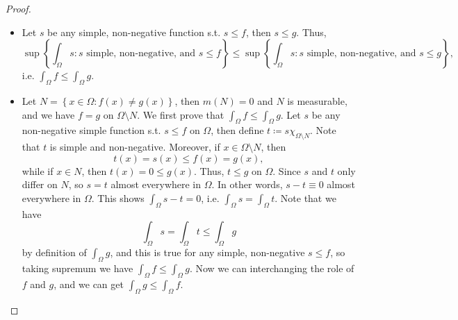 \begin{proof}
\begin{itemize}
    \item [(c)] Let \(s\) be any simple, non-negative function s.t. \(s \le f\), then \(s \le g\). Thus,
    \[
        \sup \left\{ \int _\Omega s: s \text{ simple, non-negative, and } s \le f  \right\} \le \sup \left\{ \int _\Omega s: s \text{ simple, non-negative, and } s \le g  \right\},
    \]
    i.e. \(\int _\Omega f \le \int _\Omega g\). 

    \item [(d)] Let \(N = \left\{ x \in \Omega : f(x) \neq g(x) \right\} \), then \(m(N) = 0\) and \(N\) is measurable, and we have \(f = g\) on \(\Omega \setminus N\). We first prove that \(\int _\Omega f \le \int _\Omega g\). Let \(s\) be any non-negative simple function s.t. \(s \le f\) on \(\Omega \), then define \(t\coloneqq s \chi _{\Omega \setminus N}\). Note that \(t\) is simple and non-negative. Moreover, if \(x \in \Omega \setminus N\), then 
    \[
        t(x) = s(x) \le f(x) = g(x),
    \]
    while if \(x \in N\), then \(t(x) = 0 \le g(x)\). Thus, \(t \le g\) on \(\Omega\). Since \(s\) and \(t\) only differ on \(N\), so \(s = t\) almost everywhere in \(\Omega \). In other words, \(s - t \equiv 0\) almost everywhere in \(\Omega \). This shows \(\int _\Omega s - t = 0\), i.e. \(\int _\Omega s = \int _\Omega t\). Note that we have 
    \[
        \int _\Omega s = \int _\Omega t \le \int _\Omega g
    \]             
    by definition of \(\int _\Omega g\), and this is true for any simple, non-negative \(s \le f\), so taking supremum we have \(\int _\Omega f \le \int _\Omega g\). Now we can interchanging the role of \(f\) and \(g\), and we can get \(\int _\Omega g \le \int _\Omega f\).


\end{itemize}
\end{proof}
